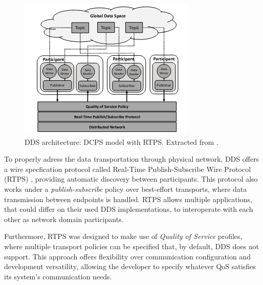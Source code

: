 \begin{figure}[H]
    \centering
    \includegraphics[width=0.4\linewidth]{images/dcps-model.png}
    \caption{DDS architecture: DCPS model with RTPS. Extracted from \cite{maruyama2016exploring}.}
    \label{fig:dcps-model}
\end{figure}

To properly adress the data transportation through physical network, DDS offers a wire specfication protocol called Real-Time Publish-Subscribe Wire Protocol (RTPS) \cite{rtps}, providing automatic discovery between participants. This protocol also works under a \textit{publish-subscribe} policy over best-effort transports, where data transmission between endpoints is handled. \cite{yun2017data} RTPS allows multiple applications, that could differ on their used DDS implementations, to interoperate with each other as network domain participants. \cite{dcps-rtps, alaerjan2017modeling} %

Furthermore, RTPS was designed to make use of \textit{Quality of Service} profiles, where multiple transport policies can be specified that, by default, DDS does not support. This approach offers flexibility over communication configuration and development versatility, allowing the developer to specify whatever QoS satisfies its system's communication needs. \cite{alaerjan2017modeling, diluoffo2018robot, maruyama2016exploring} %



